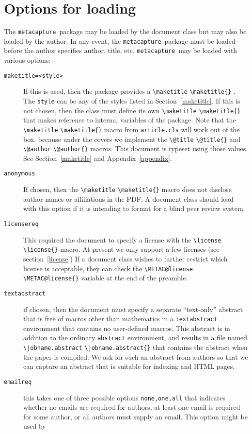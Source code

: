 \documentclass{article}
\newcommand{\pkgname}{\texttt{metacapture}}
\newcommand{\cmd}[2][]{%
  \def\FirstArg{#1}%
  \ifx\FirstArg\empty%
    \texttt{\textbackslash{}#2}%
  \else%
    \texttt{\textbackslash{}#2\{#1\}}%
  \fi
}
\begin{document}
\section{Options for loading}
The \pkgname\ package may be loaded by the document class but may also be loaded by the
author. In any event, the \pkgname\ package must be loaded before the author specifies
author, title, etc. \pkgname\  may be loaded with various options:
\begin{description}
\item[\texttt{maketitle=\textless{style}\textgreater}]
If this is used, then the package provides
a \cmd{maketitle}. The \texttt{style} can be any of the styles listed
in Section~\ref{maketitle}.  If this is not chosen, then the class
must define its own \cmd{maketitle} that makes reference to internal variables
of the package. Note that the \cmd{maketitle} macro from \texttt{article.cls} will
work out of the box, because under the covers we implement the \cmd{@title} and
\cmd{@author} macros. This document is typeset using those values. See Section~\ref{maketitle} and
Appendix~\ref{appendix}.
\item[\texttt{anonymous}] If chosen, then the \cmd{maketitle} macro does not disclose
author names or affiliations in the PDF. A document class should load
with this option if it is intending to format for a blind peer review
system.
\item[\texttt{licensereq}] This required the document to specify
a license with the \cmd{license} macro.  At present we only support a
few licenses (see section~\ref{license}) If a document class wishes to
further restrict which license is acceptable, they can check
the \cmd{METAC@license} variable at the end of the preamble.
\item[\texttt{textabstract}] if chosen, then the document must specify a
separate ``text-only'' abstract that is free of macros other than
mathematics in a \texttt{textabstract}
environment that contains no user-defined macros. This abstract is in
addition to the ordinary \texttt{abstract} environment, and results in a file
named \cmd{jobname.abstract} that contains the abstract when the paper is compiled.
We ask for such an abstract from authors so that we can capture an abstract
that is suitable for indexing and HTML pages.
\item[\texttt{emailreq}] this takes one of three possible options \texttt{none,one,all} that indicates whether
no emails are required for authors, at least one email is required for
some author, or all authors must supply an email. This option might be used by

\end{description}
\end{document}
